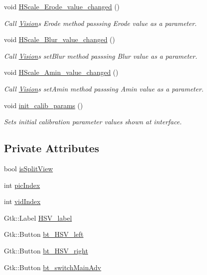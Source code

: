 \begin{DoxyCompactItemize}
void \hyperlink{class_vision_g_u_i_a945e5a987bdfb5b1d5d97bd18231d211}{H\+Scale\+\_\+\+Erode\+\_\+value\+\_\+changed} ()
\begin{DoxyCompactList}\small\item\em Call \hyperlink{class_vision}{Vision}\textquotesingle{}s Erode method passsing Erode value as a parameter. \end{DoxyCompactList}\item 
void \hyperlink{class_vision_g_u_i_a2f959701d835dd3fb53b20698754c013}{H\+Scale\+\_\+\+Blur\+\_\+value\+\_\+changed} ()
\begin{DoxyCompactList}\small\item\em Call \hyperlink{class_vision}{Vision}\textquotesingle{}s set\+Blur method passsing Blur value as a parameter. \end{DoxyCompactList}\item 
void \hyperlink{class_vision_g_u_i_a5ac13b6caa3cef4ddc8137c432b645ba}{H\+Scale\+\_\+\+Amin\+\_\+value\+\_\+changed} ()
\begin{DoxyCompactList}\small\item\em Call \hyperlink{class_vision}{Vision}\textquotesingle{}s set\+Amin method passsing Amin value as a parameter. \end{DoxyCompactList}\item 
void \hyperlink{class_vision_g_u_i_a39e2afb8ee3002e43b15758604597c9c}{init\+\_\+calib\+\_\+params} ()
\begin{DoxyCompactList}\small\item\em Sets initial calibration parameter values shown at interface. \end{DoxyCompactList}\end{DoxyCompactItemize}
\subsection*{Private Attributes}
\begin{DoxyCompactItemize}
\item 
bool \hyperlink{class_vision_g_u_i_a7706a668c306ffcfbb12fbb16e05f478}{is\+Split\+View}
\item 
int \hyperlink{class_vision_g_u_i_a45478a68d6dcd492aa57b2b4a1f14e32}{pic\+Index}
\item 
int \hyperlink{class_vision_g_u_i_a778e610a8026011498e6a685d88b3fbe}{vid\+Index}
\item 
Gtk\+::\+Label \hyperlink{class_vision_g_u_i_a87c626e284e122d0e95e66277a484dd3}{H\+S\+V\+\_\+label}
\item 
Gtk\+::\+Button \hyperlink{class_vision_g_u_i_a98323988d4a353190a02c827de0cecbf}{bt\+\_\+\+H\+S\+V\+\_\+left}
\item 
Gtk\+::\+Button \hyperlink{class_vision_g_u_i_a3b19593890776c5c77e1a39ac3af627d}{bt\+\_\+\+H\+S\+V\+\_\+right}
\item 
Gtk\+::\+Button \hyperlink{class_vision_g_u_i_a62b2427b20780649d71611c6cdb6a10a}{bt\+\_\+switch\+Main\+Adv}
\end{DoxyCompactItemize}


